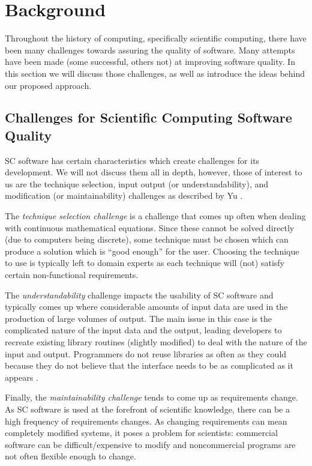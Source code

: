 \documentclass{sig-alternate-05-2015}
\begin{document}
\section{Background} \label{sec:background}

Throughout the history of computing, specifically scientific computing, there
have been many challenges towards assuring the quality of software. Many
attempts have been made (some successful, others not) at improving software
quality. In this section we will discuss those challenges, as well
as introduce the ideas behind our proposed approach.

\subsection{Challenges for Scientific Computing Software Quality} \label{ssec:challenges}

SC software has certain characteristics which create challenges for its
development. We will not discuss them all in depth, however, those of interest
to us are the technique selection, input output (or understandability), and
modification (or maintainability) challenges as described by Yu \cite{Yu2011}.

The \textit{technique selection challenge} is a challenge that comes up often
when dealing with continuous mathematical equations. Since these cannot be
solved directly (due to computers being discrete), some technique must be chosen
which can produce a solution which is ``good enough'' for the user. Choosing the
technique to use is typically left to domain experts as each technique will
(not) satisfy certain non-functional requirements.

The \textit{understandability} challenge impacts the usability of SC software and
typically comes up where considerable amounts of input data are used in the
production of large volumes of output. The main issue in this case is the
complicated nature of the input data and the output, leading developers to
recreate existing library routines (slightly modified) to deal with the
nature of the input and output. Programmers do not reuse libraries as often as they could because they do not believe that the interface needs to be as complicated as it appears \cite{Dubois2002}.

Finally, the \textit{maintainability challenge} tends to come up as requirements
change. As SC software is used at the forefront of scientific knowledge, there
can be a high frequency of requirements changes. As changing requirements can
mean completely modified systems, it poses a problem for scientists: commercial
software can be difficult/expensive to modify and noncommercial programs are not
often flexible enough to change.
\end{document}
